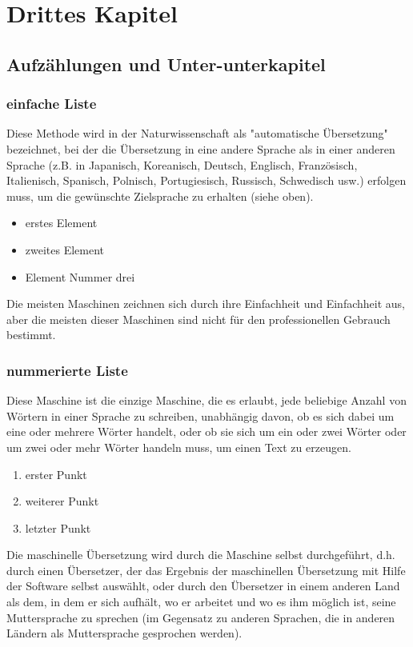 \chapter{Drittes Kapitel}

\section{Aufzählungen und Unter-unterkapitel}

\subsection{einfache Liste}

Diese Methode wird in der Naturwissenschaft als "automatische Übersetzung" bezeichnet, bei der die Übersetzung in eine andere Sprache als in einer anderen Sprache (z.B. in Japanisch, Koreanisch, Deutsch, Englisch, Französisch, Italienisch, Spanisch, Polnisch, Portugiesisch, Russisch, Schwedisch usw.) erfolgen muss, um die gewünschte Zielsprache zu erhalten (siehe oben).

\begin{itemize}
 \item erstes Element
 \item zweites Element
 \item Element Nummer drei
\end{itemize}

Die meisten Maschinen zeichnen sich durch ihre Einfachheit und Einfachheit aus, aber die meisten dieser Maschinen sind nicht für den professionellen Gebrauch bestimmt.

\subsection{nummerierte Liste}

Diese Maschine ist die einzige Maschine, die es erlaubt, jede beliebige Anzahl von Wörtern in einer Sprache zu schreiben, unabhängig davon, ob es sich dabei um eine oder mehrere Wörter handelt, oder ob sie sich um ein oder zwei Wörter oder um zwei oder mehr Wörter handeln muss, um einen Text zu erzeugen.

\begin{enumerate}
 \item erster Punkt
 \item weiterer Punkt
 \item letzter Punkt
\end{enumerate}

Die maschinelle Übersetzung wird durch die Maschine selbst durchgeführt, d.h. durch einen Übersetzer, der das Ergebnis der maschinellen Übersetzung mit Hilfe der Software selbst auswählt, oder durch den Übersetzer in einem anderen Land als dem, in dem er sich aufhält, wo er arbeitet und wo es ihm möglich ist, seine Muttersprache zu sprechen (im Gegensatz zu anderen Sprachen, die in anderen Ländern als Muttersprache gesprochen werden).

